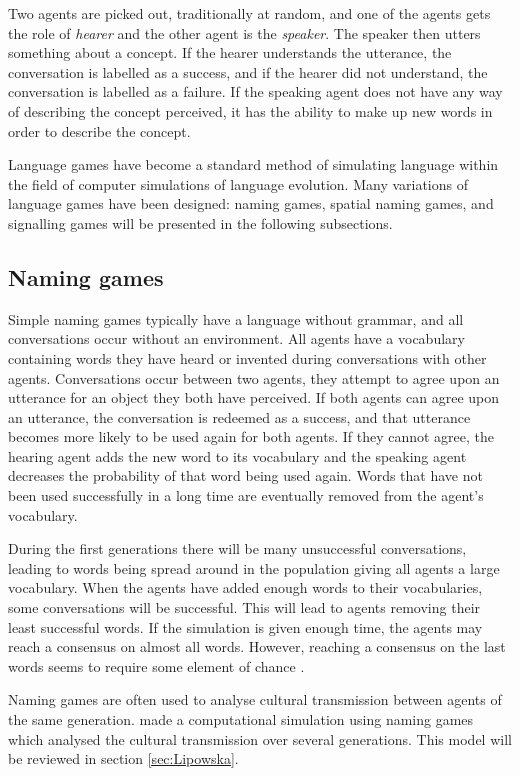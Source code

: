 Two agents are picked out, traditionally at random, and one of the agents gets the role of \textit{hearer} and the other agent is the \textit{speaker}. The speaker then utters something about a concept. If the hearer understands the utterance, the conversation is labelled as a success, and if the hearer did not understand, the conversation is labelled as a failure. If the speaking agent does not have any way of describing the concept perceived, it has the ability to make up new words in order to describe the concept. 

Language games have become a standard method of simulating language within the field of computer simulations of language evolution. Many variations of language games have been designed: naming games, spatial naming games, and signalling games will be presented in the following subsections.

\subsection{Naming games}
Simple naming games typically have a language without grammar, and all conversations occur without an environment. All agents have a vocabulary containing words they have heard or invented during conversations with other agents. Conversations occur between two agents, they attempt to agree upon an utterance for an object they both have perceived. If both agents can agree upon an utterance, the conversation is redeemed as a success, and that utterance becomes more likely to be used again for both agents. If they cannot agree, the hearing agent adds the new word to its vocabulary and the speaking agent decreases the probability of that word being used again. Words that have not been used successfully in a long time are eventually removed from the agent's vocabulary.

During the first generations there will be many unsuccessful conversations, leading to words being spread around in the population giving all agents a large vocabulary. When the agents have added enough words to their vocabularies, some conversations will be successful. This will lead to agents removing their least successful words. If the simulation is given enough time, the agents may reach a consensus on almost all words. However, reaching a consensus on the last words seems to require some element of chance \citep{steels1997synthetic}.

Naming games are often used to analyse cultural transmission between agents of the same generation. \citeauthor{lipowska2011naming} made a computational simulation using naming games which analysed the cultural transmission over several generations. This model will be reviewed in section \ref{sec:Lipowska}.

